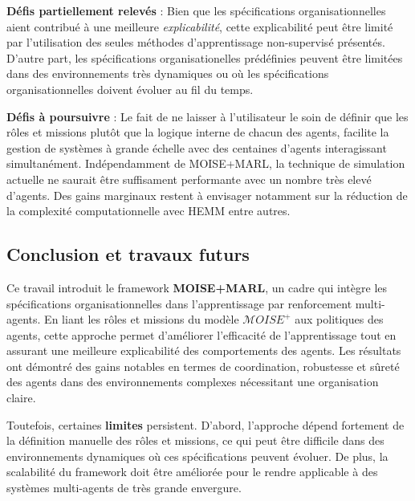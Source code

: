 \documentclass[sigconf,anonymous]{aamas}
\begin{document}
\textbf{Défis partiellement relevés} : Bien que les spécifications organisationnelles aient contribué à une meilleure \textit{explicabilité}, cette explicabilité peut être limité par l'utilisation des seules méthodes d'apprentissage non-supervisé présentés. D'autre part, les spécifications organisationelles prédéfinies peuvent être limitées dans des environnements très dynamiques ou où les spécifications organisationnelles doivent évoluer au fil du temps.

\textbf{Défis à poursuivre} : Le fait de ne laisser à l'utilisateur le soin de définir que les rôles et missions plutôt que la logique interne de chacun des agents, facilite la gestion de systèmes à grande échelle avec des centaines d'agents interagissant simultanément. Indépendamment de MOISE+MARL, la technique de simulation actuelle ne saurait être suffisament performante avec un nombre très elevé d'agents. Des gains marginaux restent à envisager notamment sur la réduction de la complexité computationnelle avec HEMM entre autres.

\subsection{Conclusion et travaux futurs}

Ce travail introduit le framework \textbf{MOISE+MARL}, un cadre qui intègre les spécifications organisationnelles dans l'apprentissage par renforcement multi-agents. En liant les rôles et missions du modèle $\mathcal{M}OISE^+$ aux politiques des agents, cette approche permet d'améliorer l'efficacité de l'apprentissage tout en assurant une meilleure explicabilité des comportements des agents. Les résultats ont démontré des gains notables en termes de coordination, robustesse et sûreté des agents dans des environnements complexes nécessitant une organisation claire.

Toutefois, certaines \textbf{limites} persistent. D'abord, l'approche dépend fortement de la définition manuelle des rôles et missions, ce qui peut être difficile dans des environnements dynamiques où ces spécifications peuvent évoluer. De plus, la scalabilité du framework doit être améliorée pour le rendre applicable à des systèmes multi-agents de très grande envergure.
\end{document}
